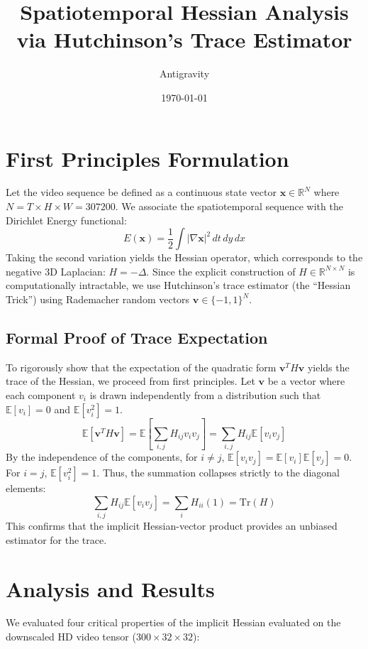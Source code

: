 \documentclass{article}
\title{Spatiotemporal Hessian Analysis via Hutchinson's Trace Estimator}
\author{Antigravity}
\date{\today}
\begin{document}
\maketitle

\section{First Principles Formulation}
Let the video sequence be defined as a continuous state vector $\mathbf{x} \in \mathbb{R}^N$ where $N = T \times H \times W = 307200$. 
We associate the spatiotemporal sequence with the Dirichlet Energy functional:
\begin{equation}
E(\mathbf{x}) = \frac{1}{2} \int |\nabla \mathbf{x}|^2 \, dt \, dy \, dx
\end{equation}
Taking the second variation yields the Hessian operator, which corresponds to the negative 3D Laplacian: $H = -\Delta$. 
Since the explicit construction of $H \in \mathbb{R}^{N \times N}$ is computationally intractable, we use Hutchinson's trace estimator (the ``Hessian Trick'') using Rademacher random vectors $\mathbf{v} \in \{-1, 1\}^N$.

\subsection{Formal Proof of Trace Expectation}
To rigorously show that the expectation of the quadratic form $\mathbf{v}^T H \mathbf{v}$ yields the trace of the Hessian, we proceed from first principles.
Let $\mathbf{v}$ be a vector where each component $v_i$ is drawn independently from a distribution such that $\mathbb{E}[v_i] = 0$ and $\mathbb{E}[v_i^2] = 1$.
\begin{equation}
\mathbb{E}[\mathbf{v}^T H \mathbf{v}] = \mathbb{E}\left[ \sum_{i,j} H_{ij} v_i v_j \right] = \sum_{i,j} H_{ij} \mathbb{E}[v_i v_j]
\end{equation}
By the independence of the components, for $i \neq j$, $\mathbb{E}[v_i v_j] = \mathbb{E}[v_i]\mathbb{E}[v_j] = 0$. For $i = j$, $\mathbb{E}[v_i^2] = 1$. Thus, the summation collapses strictly to the diagonal elements:
\begin{equation}
\sum_{i,j} H_{ij} \mathbb{E}[v_i v_j] = \sum_{i} H_{ii} (1) = \text{Tr}(H)
\end{equation}
This confirms that the implicit Hessian-vector product provides an unbiased estimator for the trace.

\section{Analysis and Results}
We evaluated four critical properties of the implicit Hessian evaluated on the downscaled HD video tensor ($300 \times 32 \times 32$):
\end{document}
